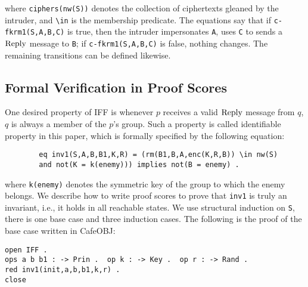 \documentclass[a4paper,fleqn]{cas-dc}
\begin{document}
\noindent
where \verb!ciphers(nw(S))! denotes the collection of ciphertexts gleaned by the intruder, and \verb!\in! is the membership predicate.
The equations say that if \verb!c-fkrm1(S,A,B,C)! is true, then the intruder  impersonates \verb!A!, uses \verb!C! to sends a $\rm Reply$ message to \verb!B!; if \verb!c-fkrm1(S,A,B,C)! is false, nothing changes. The remaining transitions can be defined likewise.

\subsection{Formal Verification in Proof Scores} 
\label{subsect-prsc}
One desired property of IFF  is whenever $p$ receives a valid $\rm Reply$ message from $q$, $q$ is always a member of the $p$'s group. Such a property is called identifiable property in this paper, which is formally specified by the following equation:  

\begin{small}
	\begin{verbatim}
		eq inv1(S,A,B,B1,K,R) = (rm(B1,B,A,enc(K,R,B)) \in nw(S) 
		and not(K = k(enemy))) implies not(B = enemy) .
	\end{verbatim}
\end{small}

%

\noindent
where \verb!k(enemy)! denotes the symmetric key of the group to which the enemy belongs.
We describe how to write proof scores to prove that \verb!inv1! is truly an invariant, i.e., it holds in all reachable states.
We use structural induction on \verb!S!, there is one base case and three induction cases. The following is the proof of the base case written in CafeOBJ:

\begin{small}
\begin{verbatim}
open IFF .
ops a b b1 : -> Prin .  op k : -> Key .  op r : -> Rand .
red inv1(init,a,b,b1,k,r) .
close
\end{verbatim}
\end{small}
\end{document}
